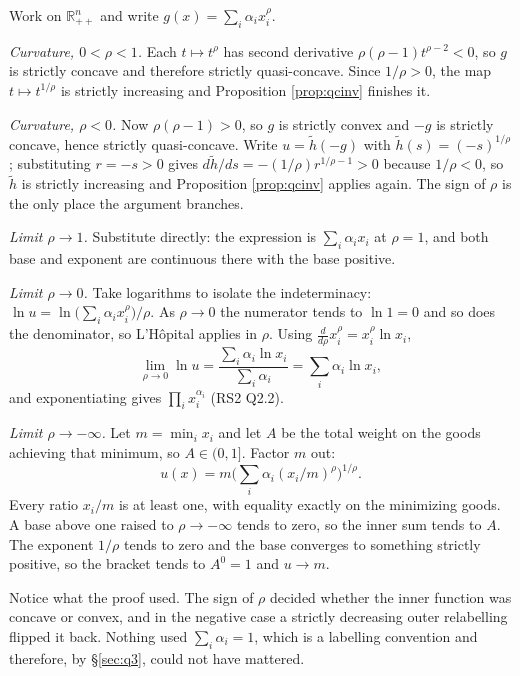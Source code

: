 \documentclass[11pt,letterpaper]{article}
\theoremstyle{definition}
\theoremstyle{plain}
\newcommand{\src}[1]{{\small\textsf{(#1)}}}
\newcommand{\skipnote}{\noindent{\small\textsf{Proof. Skippable on a first read.}}\par\smallskip}
\begin{document}
\skipnote
\begin{leftbar}
\small
Work on $\mathbb{R}^n_{++}$ and write $g(x) = \sum_i \alpha_i x_i^{\rho}$.

\emph{Curvature, $0 < \rho < 1$.} Each $t \mapsto t^\rho$ has second derivative
$\rho(\rho-1)t^{\rho-2} < 0$, so $g$ is strictly concave and therefore strictly quasi-concave. Since
$1/\rho > 0$, the map $t \mapsto t^{1/\rho}$ is strictly increasing and Proposition \ref{prop:qcinv}
finishes it.

\emph{Curvature, $\rho < 0$.} Now $\rho(\rho-1) > 0$, so $g$ is strictly convex and $-g$ is strictly
concave, hence strictly quasi-concave. Write $u = \tilde h(-g)$ with $\tilde h(s) = (-s)^{1/\rho}$;
substituting $r = -s > 0$ gives $d\tilde h/ds = -(1/\rho) r^{1/\rho - 1} > 0$ because $1/\rho < 0$,
so $\tilde h$ is strictly increasing and Proposition \ref{prop:qcinv} applies again. The sign of
$\rho$ is the only place the argument branches.

\emph{Limit $\rho \to 1$.} Substitute directly: the expression is $\sum_i \alpha_i x_i$ at
$\rho = 1$, and both base and exponent are continuous there with the base positive.

\emph{Limit $\rho \to 0$.} Take logarithms to isolate the indeterminacy:
$\ln u = \ln\big(\sum_i \alpha_i x_i^\rho\big) / \rho$. As $\rho \to 0$ the numerator tends to
$\ln 1 = 0$ and so does the denominator, so L'H\^opital applies in $\rho$. Using
$\frac{d}{d\rho} x_i^\rho = x_i^\rho \ln x_i$,
\[
\lim_{\rho \to 0} \ln u
= \frac{\sum_i \alpha_i \ln x_i}{\sum_i \alpha_i} = \sum_i \alpha_i \ln x_i ,
\]
and exponentiating gives $\prod_i x_i^{\alpha_i}$ \src{RS2 Q2.2}.

\emph{Limit $\rho \to -\infty$.} Let $m = \min_i x_i$ and let $A$ be the total weight on the goods
achieving that minimum, so $A \in (0,1]$. Factor $m$ out:
\[
u(x) = m \Big( \sum_i \alpha_i (x_i/m)^{\rho} \Big)^{1/\rho} .
\]
Every ratio $x_i/m$ is at least one, with equality exactly on the minimizing goods. A base above one
raised to $\rho \to -\infty$ tends to zero, so the inner sum tends to $A$. The exponent $1/\rho$
tends to zero and the base converges to something strictly positive, so the bracket tends to
$A^0 = 1$ and $u \to m$.
\end{leftbar}

Notice what the proof used. The sign of $\rho$ decided whether the inner function was concave or
convex, and in the negative case a strictly decreasing outer relabelling flipped it back. Nothing
used $\sum_i \alpha_i = 1$, which is a labelling convention and therefore, by \S\ref{sec:q3}, could
not have mattered.
\end{document}
